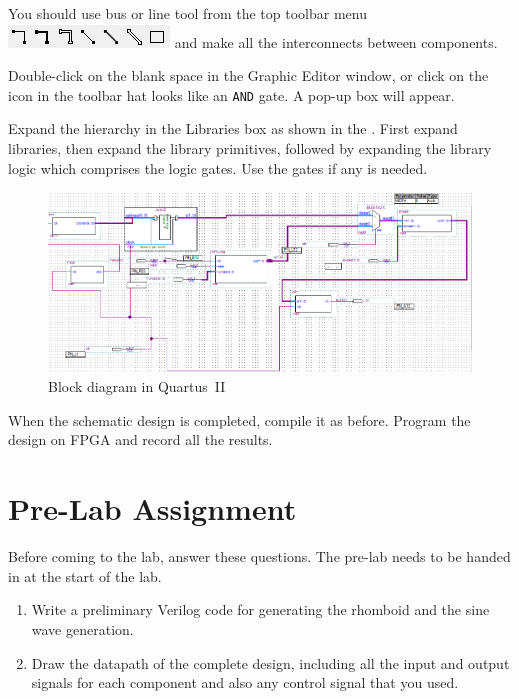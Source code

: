 \documentclass[12pt, logo=tehranDLDL/ut]{tehranDLDL}
\begin{document}
You should use bus or line tool from the top toolbar menu  \includegraphics[height=2ex]{QuartusII4} and make all the interconnects between components.

Double-click on the blank space in the Graphic Editor window, or click on the icon in the toolbar hat looks like an \texttt{AND} gate. A pop-up box will appear.

Expand the hierarchy in the Libraries box as shown in the . First expand libraries, then expand the library primitives, followed by expanding the library logic which comprises the logic gates. Use the gates if any is needed.

\begin{figure}
    \centering
    \caption{Block diagram in Quartus~II\label{fig:qblockdia}}
    \includegraphics[width=\textwidth]{QuartusII5}
\end{figure}

When the schematic design is completed, compile it as before. Program the design on FPGA and record all the results.

\designverification{}

\section*{Pre-Lab Assignment}
Before coming to the lab, answer these questions. The pre-lab needs to be handed in at the start of the lab.

\begin{enumerate}
    \item Write a preliminary Verilog code for generating the rhomboid and the sine wave generation.
    \item Draw the datapath of the complete design, including all the input and output signals for each component and also any control signal that you used.
\end{enumerate}
\end{document}
